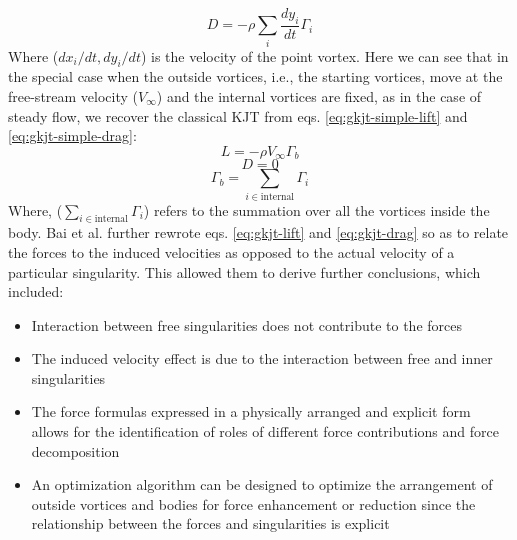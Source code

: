 \begin{equation}
	D = - \rho \sum_i \frac{d y_i}{dt} \Gamma_i
	\label{eq:gkjt-simple-drag}
\end{equation}
Where ($dx_i/dt, dy_i/dt$) is the velocity of the point vortex.
Here we can see that in the special case when the outside vortices, i.e., the starting vortices, move at the free-stream velocity ($V_{\infty}$) and the internal vortices are fixed, as in the case of steady flow, we recover the classical KJT from eqs. \ref{eq:gkjt-simple-lift} and \ref{eq:gkjt-simple-drag}:
\begin{equation}
	L = - \rho V_{\infty} \Gamma_b
\end{equation}
\begin{equation}
	D = 0
\end{equation}
\begin{equation}
	\Gamma_b = \sum_{i \in \text{internal}} \Gamma_i
\end{equation}
Where, ($\sum_{i \in \text{internal}} \Gamma_i$) refers to the summation over all the vortices inside the body.
Bai et al. further rewrote eqs. \ref{eq:gkjt-lift} and \ref{eq:gkjt-drag} so as to relate the forces to the induced velocities as opposed to the actual velocity of a particular singularity. This allowed them to derive further conclusions, which included:
\begin{itemize}
	\item Interaction between free singularities does not contribute to the forces
	\item The induced velocity effect is due to the interaction between free and inner singularities
	\item The force formulas expressed in a physically arranged and explicit form allows for the identification of roles of different force contributions and force decomposition
	\item An optimization algorithm can be designed to optimize the arrangement of outside vortices and bodies for force enhancement or reduction since the relationship between the forces and singularities is explicit
\end{itemize}

